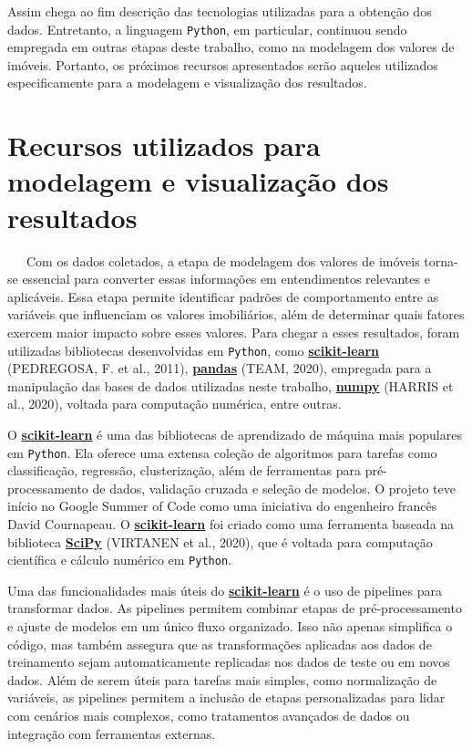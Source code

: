 \documentclass[
  12pt,
  a4paper,
]{scrreprt}
\begin{document}
Assim chega ao fim descrição das tecnologias utilizadas para a obtenção
dos dados. Entretanto, a linguagem \texttt{Python}, em particular,
continuou sendo empregada em outras etapas deste trabalho, como na
modelagem dos valores de imóveis. Portanto, os próximos recursos
apresentados serão aqueles utilizados especificamente para a modelagem e
visualização dos resultados.

\section{Recursos utilizados para modelagem e visualização dos
resultados}\label{recursos-utilizados-para-modelagem-e-visualizauxe7uxe3o-dos-resultados}

~~~Com os dados coletados, a etapa de modelagem dos valores de imóveis
torna-se essencial para converter essas informações em entendimentos
relevantes e aplicáveis. Essa etapa permite identificar padrões de
comportamento entre as variáveis que influenciam os valores
imobiliários, além de determinar quais fatores exercem maior impacto
sobre esses valores. Para chegar a esses resultados, foram utilizadas
bibliotecas desenvolvidas em \texttt{Python}, como
\href{https://scikit-learn.org/stable/}{\textbf{scikit-learn}}
(PEDREGOSA, F. et al., 2011),
\href{https://pandas.pydata.org/}{\textbf{pandas}} (TEAM, 2020),
empregada para a manipulação das bases de dados utilizadas neste
trabalho, \href{https://numpy.org/}{\textbf{numpy}} (HARRIS et al.,
2020), voltada para computação numérica, entre outras.

\vspace{12pt}

O \href{https://scikit-learn.org/stable/}{\textbf{scikit-learn}} é uma
das bibliotecas de aprendizado de máquina mais populares em
\texttt{Python}. Ela oferece uma extensa coleção de algoritmos para
tarefas como classificação, regressão, clusterização, além de
ferramentas para pré-processamento de dados, validação cruzada e seleção
de modelos. O projeto teve início no Google Summer of Code como uma
iniciativa do engenheiro francês David Cournapeau. O
\href{https://scikit-learn.org/stable/}{\textbf{scikit-learn}} foi
criado como uma ferramenta baseada na biblioteca
\href{https://scipy.org/}{\textbf{SciPy}} (VIRTANEN et al., 2020), que é
voltada para computação científica e cálculo numérico em
\texttt{Python}.

\vspace{12pt}

Uma das funcionalidades mais úteis do
\href{https://scikit-learn.org/stable/}{\textbf{scikit-learn}} é o uso
de pipelines para transformar dados. As pipelines permitem combinar
etapas de pré-processamento e ajuste de modelos em um único fluxo
organizado. Isso não apenas simplifica o código, mas também assegura que
as transformações aplicadas aos dados de treinamento sejam
automaticamente replicadas nos dados de teste ou em novos dados. Além de
serem úteis para tarefas mais simples, como normalização de variáveis,
as pipelines permitem a inclusão de etapas personalizadas para lidar com
cenários mais complexos, como tratamentos avançados de dados ou
integração com ferramentas externas.
\end{document}
